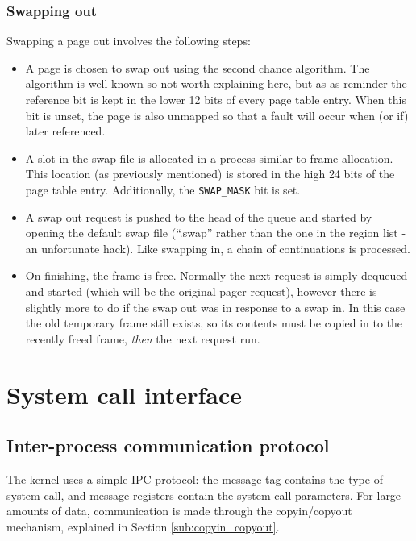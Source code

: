 \documentclass[12pt,english]{article}
\begin{document}
\subsubsection{Swapping out}

Swapping a page out involves the following steps:
\begin{itemize}
\item A page is chosen to swap out using the second chance algorithm.  The algorithm is well known so not worth explaining here, but as as reminder the reference bit is kept in the lower 12 bits of every page table entry.  When this bit is unset, the page is also unmapped so that a fault will occur when (or if) later referenced.
\item A slot in the swap file is allocated in a process similar to frame allocation.  This location (as previously mentioned) is stored in the high 24 bits of the page table entry.  Additionally, the \texttt{SWAP\_MASK} bit is set.
\item A swap out request is pushed to the head of the queue and started by opening the default swap file (``.swap'' rather than the one in the region list - an unfortunate hack).  Like swapping in, a chain of continuations is processed.
\item On finishing, the frame is free.  Normally the next request is simply dequeued and started (which will be the original pager request), however there is slightly more to do if the swap out was in response to a swap in.  In this case the old temporary frame still exists, so its contents must be copied in to the recently freed frame, \emph{then} the next request run.
\end{itemize}



\newpage{}
\section{System call interface} \label{sub:system_call_interface}

\subsection{Inter-process communication protocol}

The kernel uses a simple IPC protocol: the message tag contains the type of system call, and message registers contain the system call parameters.  For large amounts of data, communication is made through the copyin/copyout mechanism, explained in Section \ref{sub:copyin_copyout}.
\end{document}
